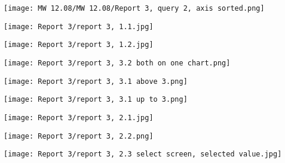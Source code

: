\begin{center}
  \texttt{[image: MW 12.08/MW 12.08/Report 3, query 2, axis sorted.png]}
\end{center}


\begin{center}
  \texttt{[image: Report 3/report 3, 1.1.jpg]}
\end{center}



\begin{center}
  \texttt{[image: Report 3/report 3, 1.2.jpg]}
\end{center}


\begin{center}
  \texttt{[image: Report 3/report 3, 3.2 both on one chart.png]}
\end{center}


\begin{center}
  \texttt{[image: Report 3/report 3, 3.1 above 3.png]}
\end{center}


\begin{center}
  \texttt{[image: Report 3/report 3, 3.1 up to 3.png]}
\end{center}


\begin{center}
  \texttt{[image: Report 3/report 3, 2.1.jpg]}
\end{center}

\begin{center}
  \texttt{[image: Report 3/report 3, 2.2.png]}
\end{center}

\begin{center}
  \texttt{[image: Report 3/report 3, 2.3 select screen, selected value.jpg]}
\end{center}


